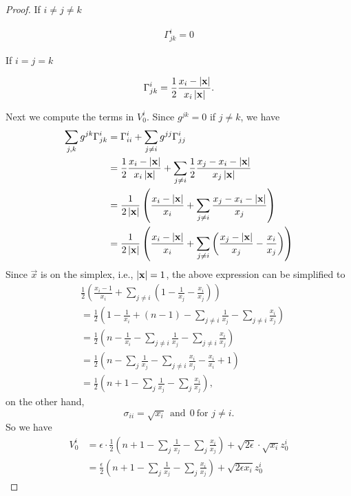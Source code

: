\begin{proof}
If $i\ne j\ne k$

\begin{align}
\Gamma_{jk}^i=0
\end{align}

If $i=j=k$

\begin{align}
\Gamma_{jk}^i=\frac{1}{2}\frac{x_i-\left|\mathbf{x}\right|}{x_i\left|\mathbf{x}\right|}.
\end{align}

Next we compute the terms in $V_0^i$. Since $g^{jk}=0$ if $j\ne k$, we have
\begin{align}
\sum_{j,k}g^{jk}\Gamma_{jk}^i&=\Gamma_{ii}^i+\sum_{j\ne i}g^{jj}\Gamma_{jj}^i
\\
&=\frac{1}{2}\frac{x_i-\left|\mathbf{x}\right|}{x_i\left|\mathbf{x}\right|}+\sum_{j\ne i}\frac{1}{2}\frac{x_j-x_i-\left|\mathbf{x}\right|}{x_j\left|\mathbf{x}\right|}
\\
&=\frac{1}{2\left|\mathbf{x}\right|}\left(\frac{x_i-\left|\mathbf{x}\right|}{x_i}+\sum_{j\ne i}\frac{x_j-x_i-\left|\mathbf{x}\right|}{x_j}\right)
\\
&=\frac{1}{2\left|\mathbf{x}\right|}\left(\frac{x_i-\left|\mathbf{x}\right|}{x_i}+\sum_{j\ne i}\left(\frac{x_j-\left|\mathbf{x}\right|}{x_j}-\frac{x_i}{x_j}\right)\right)
\end{align}
Since $\vec{x}$ is on the simplex, i.e., $\left|\mathbf{x}\right|=1$, the above expression can be simplified to
\begin{align}
&\frac{1}{2}\left(\frac{x_i-1}{x_i}+\sum_{j\ne i}\left(1-\frac{1}{x_j}-\frac{x_i}{x_j}\right)\right)
\\
&=\frac{1}{2}\left(1-\frac{1}{x_i}+(n-1)-\sum_{j\ne i}\frac{1}{x_j}-\sum_{j\ne i}\frac{x_i}{x_j}\right)
\\
&=\frac{1}{2}\left(n-\frac{1}{x_i}-\sum_{j\ne i}\frac{1}{x_j}-\sum_{j\ne i}\frac{x_i}{x_j}\right)
\\
&=\frac{1}{2}\left(n-\sum_{j}\frac{1}{x_j}-\sum_{j\ne i}\frac{x_i}{x_j}-\frac{x_i}{x_i}+1\right)
\\
&=\frac{1}{2}\left(n+1-\sum_{j}\frac{1}{x_j}-\sum_{j}\frac{x_i}{x_j}\right),
\end{align} 
on the other hand, 
\[
\sigma_{ii}=\sqrt{x_i}\ \ \text{and}\ \ 0\ \text{for }j\ne i.
\]
So we have
\begin{align}
V_0^i&=\epsilon\cdot\frac{1}{2}\left(n+1-\sum_{j}\frac{1}{x_j}-\sum_{j}\frac{x_i}{x_j}\right)+\sqrt{2\epsilon}\cdot\sqrt{x_i}z_0^i
\\
&=\frac{\epsilon}{2}\left(n+1-\sum_{j}\frac{1}{x_j}-\sum_{j}\frac{x_i}{x_j}\right)+\sqrt{2\epsilon x_i}z_0^i
\end{align}



\end{proof}
